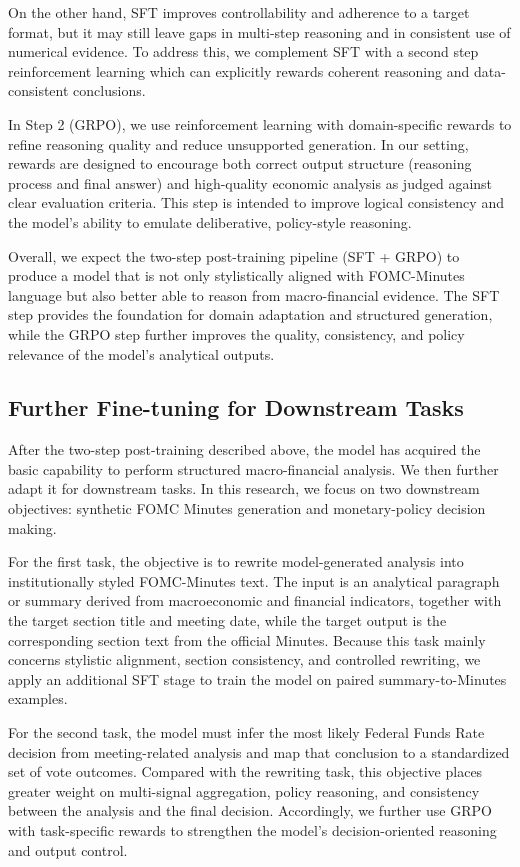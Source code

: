 On the other hand, SFT improves controllability and adherence to a target format, but it may still leave gaps in multi-step reasoning and in consistent use of numerical evidence. To address this, we complement SFT with a second step reinforcement learning which can explicitly rewards coherent reasoning and data-consistent conclusions.


In Step 2 (GRPO), we use reinforcement learning with domain-specific rewards to refine reasoning quality and reduce unsupported generation. In our setting, rewards are designed to encourage both correct output structure (reasoning process and final answer) and  high-quality economic analysis as judged against clear evaluation criteria. This step is intended to improve logical consistency and the model's ability to emulate deliberative, policy-style reasoning.


Overall, we expect the two-step post-training pipeline (SFT + GRPO) to produce a model that is not only stylistically aligned with FOMC-Minutes language but also better able to reason from macro-financial evidence. The SFT step provides the foundation for domain adaptation and structured generation, while the GRPO step further improves the quality, consistency, and policy relevance of the model’s analytical outputs. 


\subsection*{Further Fine-tuning for Downstream Tasks}
After the two-step post-training described above, the model has acquired the basic capability to perform structured macro-financial analysis. We then further adapt it for downstream tasks. In this research, we focus on two downstream objectives: synthetic FOMC Minutes generation and monetary-policy decision making.

For the first task, the objective is to rewrite model-generated analysis into institutionally styled FOMC-Minutes text. The input is an analytical paragraph or summary derived from macroeconomic and financial indicators, together with the target section title and meeting date, while the target output is the corresponding section text from the official Minutes. Because this task mainly concerns stylistic alignment, section consistency, and controlled rewriting, we apply an additional SFT stage to train the model on paired summary-to-Minutes examples.

For the second task, the model must infer the most likely Federal Funds Rate decision from meeting-related analysis and map that conclusion to a standardized set of vote outcomes. Compared with the rewriting task, this objective places greater weight on multi-signal aggregation, policy reasoning, and consistency between the analysis and the final decision. Accordingly, we further use GRPO with task-specific rewards to strengthen the model's decision-oriented reasoning and output control.



